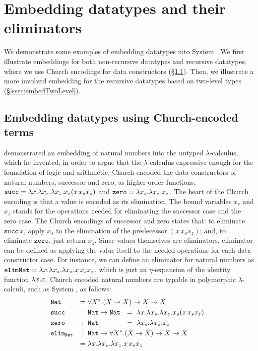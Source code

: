 \section{Embedding datatypes and their eliminators} \label{sec:data}
We demonstrate some examples of embedding datatypes into System \Fi.
We first illustrate embeddings for both non-recursive datatypes and
recursive datatypes, where we use Church encodings \cite{Church33}
for data constructors (\S\ref{ssec:embedChurch}). Then, we illustrate
a more involved embedding for the recursive datatypes based on two-level types
(\S\ref{ssec:embedTwoLevel}).

\subsection{Embedding datatypes using Church-encoded terms}
\label{ssec:embedChurch}
\citet{Church33} demonstrated an embedding of natural numbers into
the untyped $\lambda$-calculus, which he invented, in order to argue
that the $\lambda$-calculus  expressive enough for the foundation of
logic and arithmetic. Church encoded the data constructors of natural numbers,
successor and zero, as higher-order functions,
$\mathtt{succ}=\lambda x.\lambda x_s.\lambda x_z.x_s(x\,x_s x_z)$ and
$\mathtt{zero}=\lambda x_s.\lambda x_z.x_z$.
The heart of the Church encoding is that a value is encoded as its elimination.
The bound variables $x_s$ and $x_z$ stands for the operations needed for
eliminating the successor case and the zero case. The Church encodings of
successor and zero states that: to eliminate $\mathtt{succ}\,x$, apply $x_s$
to the elimination of the predecessor $(x\,x_s x_z)$; and,
to eliminate $\mathtt{zero}$, just return $x_z$.
Since values themselves are eliminators,
eliminator can be defined as applying the value itself to the needed operations
for each data constructor case. For instance, we can define an eliminator
for natural numbers as $\mathtt{elimNat}=\lambda x.\lambda x_s.\lambda x_z.x\,x_s x_z$,
which is just an $\eta$-expansion of the identity function $\lambda x.x$.
Church encoded natural numbers are typable in polymorphic $\lambda$-calculi,
such as System \Fw, as follows:\vspace*{-7pt}
\begin{align*}
&\texttt{Nat} &=~& \forall X^{*}.(X -> X) -> X -> X \qquad\qquad\qquad\\
&\texttt{succ} &\!\!\!:~~& \texttt{Nat} -> \texttt{Nat}
	~~ =~ \l x.\l x_s.\l x_z.x_s(x\,x_s x_z) \\
&\texttt{zero} &\!\!\!:~~& \texttt{Nat} \qquad\quad\,
	~~ =~ \l x_s.\l x_z.x_z \\
&\mathtt{elim_{Nat}} &\!\!\!:~~& \texttt{Nat} -> \forall X^{*}.(X -> X)-> X-> X \\
& &=~& \l x.\l x_s.\l x_z.x\,x_s x_z
\end{align*}~\vspace*{-15pt}

